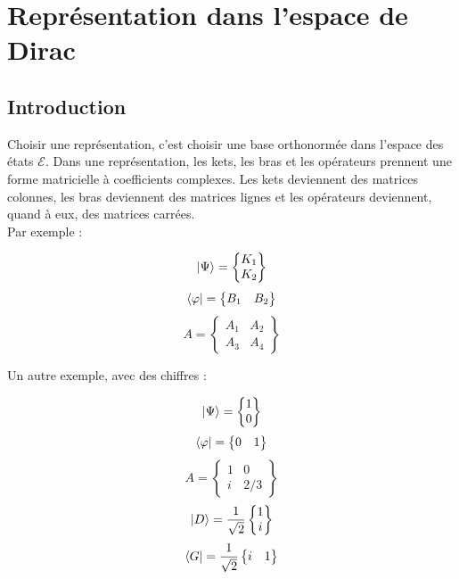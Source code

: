 \documentclass[12pt,a4paper,titlepage]{book}
\begin{document}
\section{Représentation dans l'espace de Dirac}
\subsection{Introduction}

Choisir une représentation, c'est choisir une base orthonormée dans l'espace des états $\mathcal{E}$. Dans une représentation, les kets, les bras et les opérateurs prennent une forme matricielle à coefficients complexes. Les kets deviennent des matrices colonnes, les bras deviennent des matrices lignes et les opérateurs deviennent, quand à eux, des matrices carrées.\\

Par exemple :
\begin{center}
\[
\ket{\Psi}=
\left\lbrace
\begin{matrix}
K_1 \\
K_2
\end{matrix}
\right\rbrace
\]
\[
\bra{\varphi}=
\left\lbrace
\begin{matrix}
B_1 & B_2\\
\end{matrix}
\right\rbrace
\]
\[
A=
\left\lbrace
\begin{matrix}
A_1 & A_2\\
A_3 & A_4
\end{matrix}
\right\rbrace
\]
\end{center}

Un autre exemple, avec des chiffres :
\begin{center}
\[
\ket{\Psi}=
\left\lbrace
\begin{matrix}
1 \\
0
\end{matrix}
\right\rbrace
\]
\[
\bra{\varphi}=
\left\lbrace
\begin{matrix}
0 & 1\\
\end{matrix}
\right\rbrace
\]
\[
A=
\left\lbrace
\begin{matrix}
1 & 0\\
i & 2/3
\end{matrix}
\right\rbrace
\]
\[
\ket{D}=\frac{1}{\sqrt{2}}
\left\lbrace
\begin{matrix}
1\\
i
\end{matrix}
\right\rbrace
\]
\[
\bra{G}= \frac{1}{\sqrt{2}}
\left\lbrace
\begin{matrix}
i & 1\\
\end{matrix}
\right\rbrace
\]
\end{center}
\end{document}
